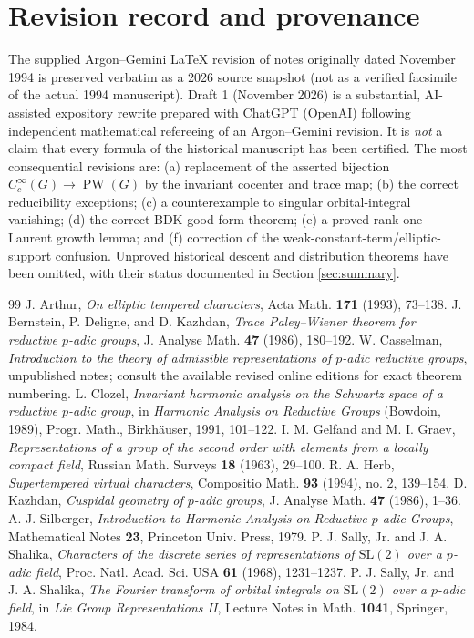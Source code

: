 \documentclass[12pt,letterpaper]{amsart}
\numberwithin{equation}{section}
\theoremstyle{definition}
\theoremstyle{remark}
\newcommand{\PW}{\operatorname{PW}}
\begin{document}
\section{Revision record and provenance}\label{app:revision}
The supplied Argon--Gemini LaTeX revision of notes originally dated November 1994 is preserved verbatim as a 2026 source snapshot (not as a verified facsimile of the actual 1994 manuscript). Draft 1 (November 2026) is a substantial, AI-assisted expository rewrite prepared with ChatGPT (OpenAI) following independent mathematical refereeing of an Argon--Gemini revision. It is \emph{not} a claim that every formula of the historical manuscript has been certified. The most consequential revisions are: (a) replacement of the asserted bijection $C_c^\infty(G)\to\PW(G)$ by the invariant cocenter and trace map; (b) the correct reducibility exceptions; (c) a counterexample to singular orbital-integral vanishing; (d) the correct BDK good-form theorem; (e) a proved rank-one Laurent growth lemma; and (f) correction of the weak-constant-term/elliptic-support confusion. Unproved historical descent and distribution theorems have been omitted, with their status documented in Section \ref{sec:summary}.

\begin{thebibliography}{99}
 J. Arthur, \emph{On elliptic tempered characters}, Acta Math. \textbf{171} (1993), 73--138.
 J. Bernstein, P. Deligne, and D. Kazhdan, \emph{Trace Paley--Wiener theorem for reductive $p$-adic groups}, J. Analyse Math. \textbf{47} (1986), 180--192.
 W. Casselman, \emph{Introduction to the theory of admissible representations of $p$-adic reductive groups}, unpublished notes; consult the available revised online editions for exact theorem numbering.
 L. Clozel, \emph{Invariant harmonic analysis on the Schwartz space of a reductive $p$-adic group}, in \emph{Harmonic Analysis on Reductive Groups} (Bowdoin, 1989), Progr. Math., Birkh\"auser, 1991, 101--122.
 I. M. Gelfand and M. I. Graev, \emph{Representations of a group of the second order with elements from a locally compact field}, Russian Math. Surveys \textbf{18} (1963), 29--100.
 R. A. Herb, \emph{Supertempered virtual characters}, Compositio Math. \textbf{93} (1994), no. 2, 139--154.
 D. Kazhdan, \emph{Cuspidal geometry of $p$-adic groups}, J. Analyse Math. \textbf{47} (1986), 1--36.
 A. J. Silberger, \emph{Introduction to Harmonic Analysis on Reductive $p$-adic Groups}, Mathematical Notes \textbf{23}, Princeton Univ. Press, 1979.
 P. J. Sally, Jr. and J. A. Shalika, \emph{Characters of the discrete series of representations of $\mathrm{SL}(2)$ over a $p$-adic field}, Proc. Natl. Acad. Sci. USA \textbf{61} (1968), 1231--1237.
 P. J. Sally, Jr. and J. A. Shalika, \emph{The Fourier transform of orbital integrals on $\mathrm{SL}(2)$ over a $p$-adic field}, in \emph{Lie Group Representations II}, Lecture Notes in Math. \textbf{1041}, Springer, 1984.
\end{thebibliography}
\end{document}
